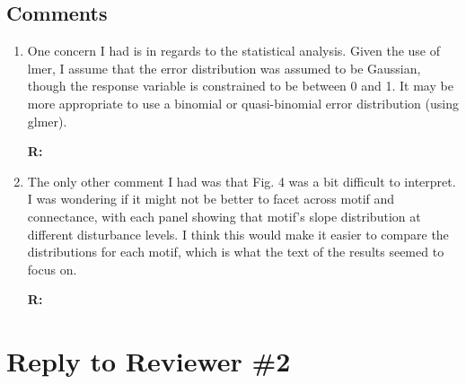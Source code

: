 \documentclass[12pt]{article}
\begin{document}
    \subsection*{Comments}

        \begin{enumerate}

            \item One concern I had is in regards to the statistical analysis. Given the use of lmer, I assume that the error distribution was assumed to be Gaussian, though the response variable is constrained to be between 0 and 1. It may be more appropriate to use a binomial or quasi-binomial error distribution (using glmer).

            \textbf{R:} 

            \item The only other comment I had was that Fig. 4 was a bit difficult to interpret. I was wondering if it might not be better to facet across motif and connectance, with each panel showing that motif's slope distribution at different disturbance levels. I think this would make it easier to compare the distributions for each motif, which is what the text of the results seemed to focus on.

            \textbf{R:}

        \end{enumerate}

\clearpage

\section*{Reply to Reviewer \#2}
\end{document}
